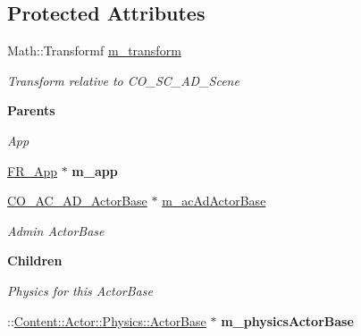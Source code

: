\subsection*{Protected Attributes}
\begin{DoxyCompactItemize}
\item 
\hypertarget{classContent_1_1Actor_1_1Renderer_1_1ActorBase_acfc17db8ac1a284e03e54084a07b5e95}{
Math::Transformf \hyperlink{classContent_1_1Actor_1_1Renderer_1_1ActorBase_acfc17db8ac1a284e03e54084a07b5e95}{m\_\-transform}}
\label{classContent_1_1Actor_1_1Renderer_1_1ActorBase_acfc17db8ac1a284e03e54084a07b5e95}

\begin{DoxyCompactList}\small\item\em Transform relative to CO\_\-SC\_\-AD\_\-Scene \item\end{DoxyCompactList}\end{DoxyCompactItemize}
\begin{Indent}{\bf Parents}\par
{\em \label{_amgrp9dafe3747e06aa15af0bfba521f66346}
 App }\begin{DoxyCompactItemize}
\item 
\hypertarget{classContent_1_1Actor_1_1Renderer_1_1ActorBase_a4dc4b0507fc49a8c5c05eb27da9c606c}{
\hyperlink{classFramework_1_1App}{FR\_\-App} $\ast$ {\bfseries m\_\-app}}
\label{classContent_1_1Actor_1_1Renderer_1_1ActorBase_a4dc4b0507fc49a8c5c05eb27da9c606c}

\item 
\hypertarget{classContent_1_1Actor_1_1Renderer_1_1ActorBase_a7f3b1d44575f27b517e989fea063b9a2}{
\hyperlink{classContent_1_1Actor_1_1Admin_1_1ActorBase}{CO\_\-AC\_\-AD\_\-ActorBase} $\ast$ \hyperlink{classContent_1_1Actor_1_1Renderer_1_1ActorBase_a7f3b1d44575f27b517e989fea063b9a2}{m\_\-acAdActorBase}}
\label{classContent_1_1Actor_1_1Renderer_1_1ActorBase_a7f3b1d44575f27b517e989fea063b9a2}

\begin{DoxyCompactList}\small\item\em Admin ActorBase \item\end{DoxyCompactList}\end{DoxyCompactItemize}
\end{Indent}
\begin{Indent}{\bf Children}\par
{\em \label{_amgrp64e4aca4297806247f62a7b5f8cbd3df}
 Physics for this ActorBase }\begin{DoxyCompactItemize}
\item 
\hypertarget{classContent_1_1Actor_1_1Renderer_1_1ActorBase_ac06e698ce2b902480198d40c30c09550}{
::\hyperlink{classContent_1_1Actor_1_1Physics_1_1ActorBase}{Content::Actor::Physics::ActorBase} $\ast$ {\bfseries m\_\-physicsActorBase}}
\label{classContent_1_1Actor_1_1Renderer_1_1ActorBase_ac06e698ce2b902480198d40c30c09550}

\end{DoxyCompactItemize}
\end{Indent}


